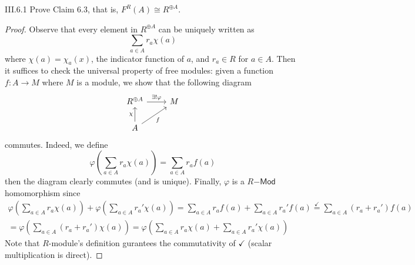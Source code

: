 \begin{problem}{III.6.1}
Prove Claim 6.3, that is, $F^R(A) \cong R^{\oplus A}$.
\end{problem}
\begin{proof}
Observe that every element in $R^{\oplus A}$ can be uniquely written as
\[
\sum_{a \in A}r_a \chi(a)
\]
where $\chi(a) = \chi_a(x)$, the indicator function of $a$, and $r_a \in R$ for $a \in A$. Then it suffices to check the universal property of free modules: given a function $f : A \to M$ where $M$ is a module, we show that the following diagram
\[
\begin{tikzcd}
R^{\oplus A} \arrow[r, "\exists!\varphi"] & M \\
A \arrow[u, "\chi"] \arrow[ru, "f"']      &
\end{tikzcd}
\]
commutes. Indeed, we define
\[
\varphi\left(\sum_{a \in A}r_a \chi(a)\right) = \sum_{a \in A}r_a f(a)
\]
then the diagram clearly commutes (and is unique). Finally, $\varphi$ is a $R\mathsf{-Mod}$ homomorphism since
\begin{align*}
\varphi\left(\sum_{a \in A}r_a \chi(a)\right) + \varphi\left(\sum_{a \in A}r_a' \chi(a)\right) = \sum_{a \in A}r_a f(a) + \sum_{a \in A}r_a' f(a)\overset{\checkmark}{=} \sum_{a \in A}(r_a+r_a') f(a) \\
= \varphi\left(\sum_{a \in A}(r_a+r_a') \chi(a)\right) = \varphi\left(\sum_{a \in A}r_a \chi(a) + \sum_{a \in A}r_a' \chi(a)\right)
\end{align*}
Note that $R$-module's definition gurantees the commutativity of $\checkmark$ (scalar multiplication is direct).
\end{proof}

